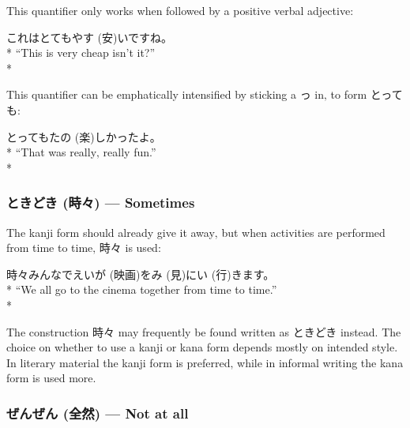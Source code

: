 \documentclass[11pt, b5paper, twoside, openright, onecolumn]{book}
\makeatletter
\newcommand*{\rubystack}[2]{{\relscale{0.5}%
  \begin{tabular}[b]{@{}c@{}}%
    {#1}\\%
   {\textscale{2}{#2}}%
  \end{tabular}}%
}
\DeclareRobustCommand*{\ruby}[2]{%
  \mbox{%
    \setlength{\parskip}{0ex}%
    \BeginAccSupp{method=pdfstringdef,ActualText={#1}}%
      \rubystack{\phantom{#2}}{#1}%
      \llap{%
        \rubystack{#2}{\phantom{#1}}%
      }%
    \EndAccSupp{}%
  }%
}
\renewcommand*{\ruby}[2]{#2 (#1)}%
\newenvironment{exampleblock}{
\setlength{\parindent}{0.6in}
\begin{minipage}[t]{\dimexpr\textwidth-\parindent}}
{\end{minipage}}
\makeatother
\begin{document}
This quantifier only works when followed by a positive verbal adjective:

\vspace{0.4cm}
\begin{exampleblock}
これはとても\ruby{安}{やす}いですね。 \\* 
“This is very cheap isn’t it?” \\* 
\end{exampleblock}
\vspace{0.2cm}

This quantifier can be emphatically intensified by sticking a っ in‚ to form とっても:

\vspace{0.4cm}
\begin{exampleblock}
とっても\ruby{楽}{たの}しかったよ。 \\* 
“That was really‚ really fun.” \\* 
\end{exampleblock}
\subsubsection{\ruby{時々}{ときどき} — Sometimes}


The kanji form should already give it away‚ but when activities are performed from time to time‚ 時々 is used:

\vspace{0.4cm}
\begin{exampleblock}
時々みんなで\ruby{映画}{えいが}を\ruby{見}{み}に\ruby{行}{い}きます。 \\* 
“We all go to the cinema together from time to time.” \\* 
\end{exampleblock}
\vspace{0.2cm}

The construction 時々 may frequently be found written as ときどき instead. The choice on whether to use a kanji or kana form depends mostly on intended style. In literary material the kanji form is preferred‚ while in informal writing the kana form is used more.

\subsubsection{\ruby{全然}{ぜんぜん} — Not at all}
\end{document}
